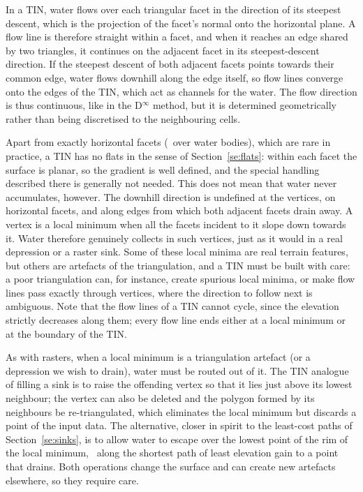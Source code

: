 In a TIN, water flows over each triangular facet in the direction of its steepest descent, which is the projection of the facet's normal onto the horizontal plane.
A flow line is therefore straight within a facet, and when it reaches an edge shared by two triangles, it continues on the adjacent facet in its steepest-descent direction.
If the steepest descent of both adjacent facets points towards their common edge, water flows downhill along the edge itself, so flow lines converge onto the edges of the TIN, which act as channels for the water.
The flow direction is thus continuous, like in the D\(^{\infty}\) method, but it is determined geometrically rather than being discretised to the neighbouring cells.

Apart from exactly horizontal facets (\eg\ over water bodies), which are rare in practice, a TIN has no flats in the sense of Section~\ref{se:flats}: within each facet the surface is planar, so the gradient is well defined, and the special handling described there is generally not needed.
This does not mean that water never accumulates, however.
The downhill direction is undefined at the vertices, on horizontal facets, and along edges from which both adjacent facets drain away.
A vertex is a local minimum when all the facets incident to it slope down towards it.
Water therefore genuinely collects in such vertices, just as it would in a real depression or a raster sink.
Some of these local minima are real terrain features, but others are artefacts of the triangulation, and a TIN must be built with care: a poor triangulation can, for instance, create spurious local minima, or make flow lines pass exactly through vertices, where the direction to follow next is ambiguous.
Note that the flow lines of a TIN cannot cycle, since the elevation strictly decreases along them; every flow line ends either at a local minimum or at the boundary of the TIN.

As with rasters, when a local minimum is a triangulation artefact (or a depression we wish to drain), water must be routed out of it.
The TIN analogue of filling a sink is to raise the offending vertex so that it lies just above its lowest neighbour; the vertex can also be deleted and the polygon formed by its neighbours be re-triangulated, which eliminates the local minimum but discards a point of the input data.
The alternative, closer in spirit to the least-cost paths of Section~\ref{se:sinks}, is to allow water to escape over the lowest point of the rim of the local minimum, \ie\ along the shortest path of least elevation gain to a point that drains.
Both operations change the surface and can create new artefacts elsewhere, so they require care.

